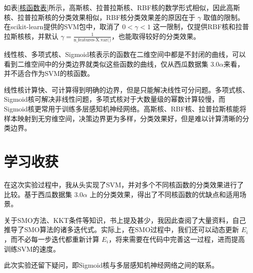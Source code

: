\documentclass{ctexart}
\begin{document}
	如表\ref{核函数表}所示，高斯核、拉普拉斯核、RBF核的数学形式相似，因此高斯核、拉普拉斯核的分类效果相似，RBF核分类效果差的原因在于 $\gamma$ 取值的限制。在scikit-learn提供的SVM包中，取消了 $0<\gamma<1$ 这一限制，仅提供RBF核和拉普拉斯核核，并默认 $\gamma=\frac{1}{\text{n\_features}\cdot\text{X.var()}}$，也能取得较好的分类效果。
	
	线性核、多项式核、Sigmoid核表示的函数在二维空间中都是不封闭的曲线，可以看到二维空间中的分类边界就类似这些函数的曲线，仅从西瓜数据集 $3.0\alpha$来看，并不适合作为SVM的核函数。
	
	线性核计算快、可计算得到明确的边界，但是只能解决线性可分问题。多项式核、Sigmoid核可解决非线性问题，多项式核对于大数量级的幂数计算较慢，而Sigmoid核更常用于训练多层感知机神经网络。高斯核、RBF核、拉普拉斯核能将样本映射到无穷维空间，决策边界更为多样，分类效果好，但是难以计算清晰的分类边界。
	
	\section{学习收获}
	
	在这次实验过程中，我从头实现了SVM，并对多个不同核函数的分类效果进行了比较。基于西瓜数据集 $3.0\alpha$ 上的分类效果，得出了不同核函数的优缺点和适用场景。
	
	关于SMO方法、KKT条件等知识，书上提及甚少，我因此查阅了大量资料，自己推导了SMO算法的诸多迭代式。实际上，在SMO过程中，我们还可以动态更新 $E_i$，而不必每一步迭代都重新计算 $E_i$，将来需要在代码中完善这一过程，进而提高训练SVM的速度。
	
	此次实验还留下疑问，即Sigmoid核与多层感知机神经网络之间的联系。
	
\end{document}
